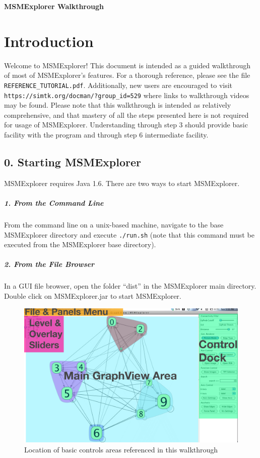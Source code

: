 \documentclass[10pt,a4paper]{report}
\begin{document}
\begin{LARGE}
\textbf{MSMExplorer Walkthrough}
\end{LARGE}
\section*{Introduction}

Welcome to MSMExplorer! This document is intended as a guided walkthrough of  most of MSMExplorer's features. For a thorough reference, please see the file \texttt{REFERENCE\_TUTORIAL.pdf}. Additionally, new users are encouraged to visit   \texttt{https://simtk.org/docman/?group\_id=529} where links to walkthrough videos may be found. Please note that this walkthrough is intended as relatively comprehensive, and that mastery of all the steps presented here is not required for usage of MSMExplorer. Understanding through step 3 should provide basic facility with the program and through step 6 intermediate facility.

\subsection*{0. Starting MSMExplorer}
MSMExplorer requires Java 1.6. There are two ways to start MSMExplorer. 

\subparagraph{1. From the Command Line}
From the command line on a unix-based machine, navigate to the base MSMExplorer directory and execute \texttt{./run.sh} (note that this command must be executed from the MSMExplorer base directory).

\subparagraph*{2. From the File Browser}
In a GUI file browser, open the folder ``dist'' in the MSMExplorer main directory. Double click on MSMExplorer.jar to start MSMExplorer. 

\begin{figure}[h]
\includegraphics[scale=.25]{overview.png}
\caption{Location of basic controls areas referenced in this walkthrough}
\end{figure}
\end{document}
